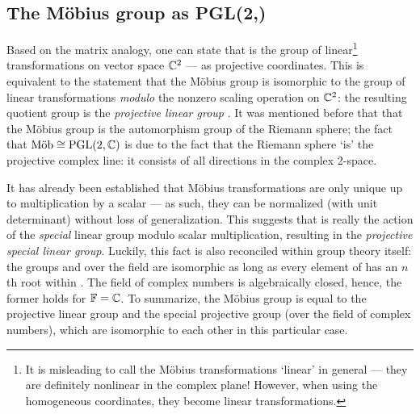 \subsection{The Möbius group as PGL(2,\complex)} 
Based on the matrix analogy, one can state that \moebiusgroup is the group of linear\footnote{It is misleading to call the Möbius transformations `linear' in general --- they are definitely nonlinear in the complex plane! However, when using the homogeneous coordinates, they become linear transformations.} transformations on vector space \(\complex^2\) --- as projective coordinates. This is equivalent to the statement that the Möbius group is isomorphic to the group of linear transformations \emph{modulo} the nonzero scaling operation on \(\complex^2\): the resulting quotient group is the \emph{projective linear group} . It was mentioned before that that the Möbius group is the automorphism group of the Riemann sphere; the fact that $\moebiusgroup \cong \pglgroup{2}{\complex}$ is due to the fact that the Riemann sphere `is' the projective complex line: it consists of all directions in the complex 2-space.

It has already been established that Möbius transformations are only unique up to multiplication by a scalar --- as such, they can be normalized (with unit determinant) without loss of generalization. This suggests that \moebiusgroup is really the action of the \emph{special} linear group modulo scalar multiplication, resulting in the \emph{projective special linear group}. Luckily, this fact is also reconciled within group theory itself: the groups  and  over the field  are isomorphic as long as every element of \field has an \(n\)th root within \field. The field of complex numbers is algebraically closed, hence, the former holds for \(\field = \complex\). To summarize, the Möbius group \moebiusgroup is equal to the projective linear group and the special projective group (over the field of complex numbers), which are isomorphic to each other in this particular case.

